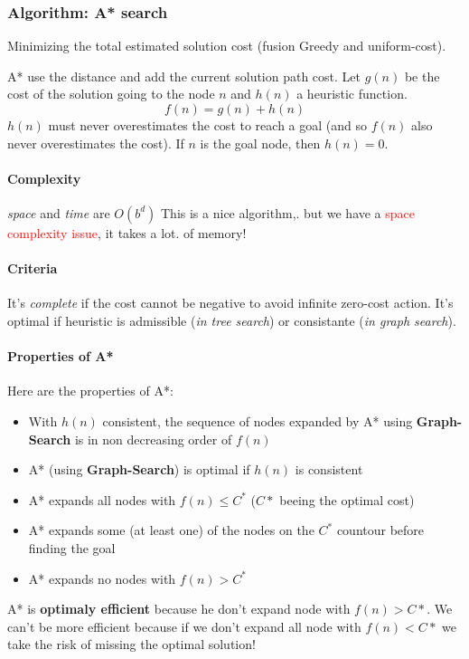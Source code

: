\subsubsection{Algorithm: A* search}
Minimizing the total estimated solution cost (fusion Greedy and uniform-cost).

A* use the  distance and add the current solution  path cost. Let $g(n)$
be the cost of the solution going to the node $n$ and $h(n)$ a heuristic
function. $$f(n)  = g(n)  + h(n)$$ $h(n)$  must never  overestimates the
cost to reach a goal (and  so $f(n)$ also never overestimates the cost).
If $n$ is the goal node, then $h(n) = 0$.

\paragraph{Complexity}

\textit{space} and \textit{time} are $O(b^d)$  This is a nice algorithm,.
but we have  a \textcolor{red}{space complexity issue}, it  takes a lot.
of memory!

\paragraph{Criteria} It's \textit{complete} if the cost cannot be negative
to avoid infinite zero-cost action. 
It's optimal if heuristic is admissible (\textit{in tree search}) or consistante
(\textit{in graph search}).

\paragraph{Properties of A*}

Here are the properties of A*:
\begin{itemize}
    \item With $h(n)$ consistent, the sequence of nodes expanded by A* using \textbf{Graph-Search} is in non decreasing order of $f(n)$
    \item A* (using \textbf{Graph-Search}) is optimal if $h(n)$ is consistent
    \item A* expands all nodes with $f(n) \leq C^*$ ($C*$ beeing the optimal cost)
    \item A* expands some (at least one) of the nodes on the $C^*$ countour before finding the goal
    \item A* expands no nodes with $f(n) > C^*$ 
\end{itemize}

A*  is \textbf{optimaly  efficient} because  he don't  expand node  with
$f(n) > C*$. We  can't be more efficient because if  we don't expand all
node with $f(n) < C*$ we take the risk of missing the optimal solution!


